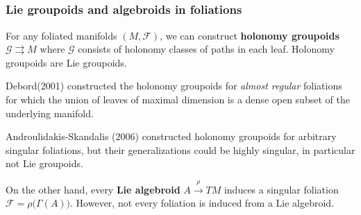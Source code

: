 \documentclass{beamer}
\theoremstyle{definition}
\theoremstyle{remark}
\numberwithin{equation}{section}
\newcommand{\CF}{{\mathcal F}}
\begin{document}
\subsection{} %




\begin{frame}
\frametitle{Lie groupoids and algebroids in foliations}
For any foliated manifolds $(M,\CF)$, we can construct {\bf holonomy groupoids} $\mathcal{G}\rightrightarrows
 M$ where $\mathcal{G}$ consists of holonomy classes of paths in each leaf. Holonomy groupoids are Lie groupoids. 




Debord(2001) constructed the holonomy groupoids for {\it almost regular} foliations for which the union of leaves of maximal dimension is a dense open subset of the underlying manifold. 

Androulidakis-Skandalis (2006) constructed holonomy groupoids for arbitrary singular foliations, but their generalizations could be highly singular, in particular not Lie groupoids. 


On the other hand, every {\bf Lie algebroid} $A\stackrel{\rho}{\to}TM$ induces a singular foliation $\CF = \rho\big(\Gamma(A) \big)$. However, not every foliation is induced from a Lie algebroid.

\end{frame}
\end{document}
